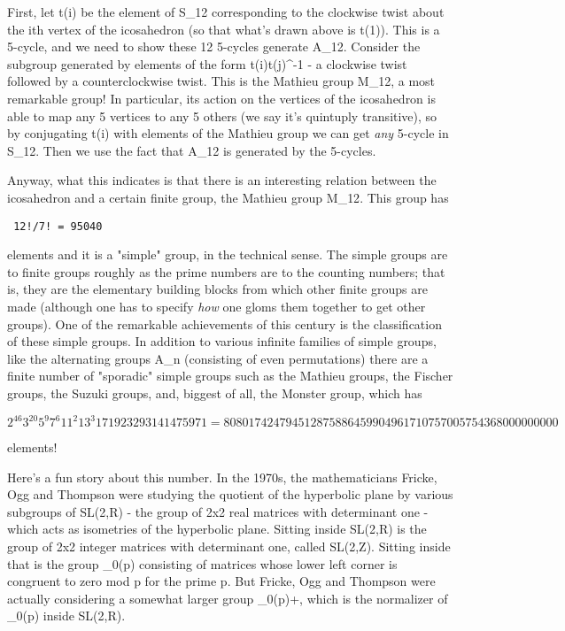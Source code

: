 First, let t(i) be the element of S_{12} corresponding to the
clockwise twist about the ith vertex of the icosahedron (so that what's
drawn above is t(1)).  This is a 5-cycle, and we need to show these 12
5-cycles generate A_{12}.  Consider the subgroup generated by
elements of the form t(i)t(j)^{-1} - a clockwise twist followed
by a counterclockwise twist.  This is the Mathieu group M_{12},
a most remarkable group!  In particular, its action on the vertices of
the icosahedron is able to map any 5 vertices to any 5 others (we say
it's quintuply transitive), so by conjugating t(i) with elements of the
Mathieu group we can get \emph{any} 5-cycle in S_{12}.  Then
we use the fact that A_{12} is generated by the 5-cycles.

Anyway, what this indicates is that there is an interesting relation
between the icosahedron and a certain finite group, the Mathieu group
M_{12}.  This group has

\begin{verbatim}
 12!/7! = 95040 
\end{verbatim}
    


elements and it is a "simple" group, in the technical sense.  The simple
groups are to finite groups roughly as the prime numbers are to the
counting numbers; that is, they are the elementary building blocks from
which other finite groups are made (although one has to specify
\emph{how} one gloms them together to get other groups).  One of the
remarkable achievements of this century is the classification of these
simple groups.  In addition to various infinite families of simple
groups, like the alternating groups A_{n} (consisting of even
permutations) there are a finite number of "sporadic" simple groups such
as the Mathieu groups, the Fischer groups, the Suzuki groups, and,
biggest of all, the Monster group, which has

$$
 2^{46} 3^{20} 5^{9} 7^{6} 11^{2} 13^{3} 17 19 23 29 31 41 47 59 71 = 
 808017424794512875886459904961710757005754368000000000
$$
    

elements!  

Here's a fun story about this number.
In the 1970s, the mathematicians Fricke, Ogg and Thompson were
studying the quotient of the hyperbolic plane by various subgroups 
of SL(2,R) - the group of 2x2 real matrices with determinant one - 
which acts as isometries of the hyperbolic plane.  
Sitting inside SL(2,R) is the group of 2x2 integer matrices
with determinant one, called SL(2,Z).  Sitting inside that is 
the group \Gamma _{0}(p) consisting of matrices whose lower left 
corner is congruent to zero mod p for the prime p.  But Fricke,
Ogg and Thompson 
were actually considering a somewhat larger group \Gamma _{0}(p)+, 
which is the normalizer of \Gamma _{0}(p) inside SL(2,R).  

